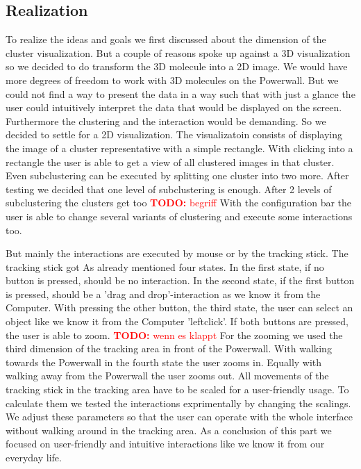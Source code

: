 \documentclass[journal]{vgtc}       %
\newcommand{\todo}[1]{\textcolor{red}{\textbf{TODO:} #1}}
\begin{document}
\subsection{Realization}

To realize the ideas and goals we first discussed about the dimension of the cluster visualization. But a couple of reasons spoke up against a 3D visualization so we decided to do transform the 3D molecule into a 2D image. We would have more degrees of freedom to work with 3D molecules on the Powerwall. But we could not find a way to present the data in a way such that with just a glance the user could intuitively interpret the data that would be displayed on the screen. Furthermore the clustering and the interaction would be demanding. So we decided to settle for a 2D visualization. 
The visualizatoin consists of displaying the image of a cluster representative with a simple rectangle. With clicking into a rectangle the user is able to get a view of all clustered images in that cluster. Even subclustering can be executed by splitting one cluster into two more. After testing we decided that one level of subclustering is enough. After 2 levels of subclustering the clusters get too  \todo{begriff}
With the configuration bar the user is able to change several variants of clustering and execute some interactions too. 

But mainly the interactions are executed by mouse or by the tracking stick. The tracking stick got As already mentioned four states. In the first state, if no button is pressed, should be no interaction. In the second state, if the first button is pressed, should be a 'drag and drop'-interaction as we know it from the Computer. With pressing the other button, the third state, the user can select an object like we know it from the Computer 'leftclick'. If both buttons are pressed, the user is able to zoom. \todo{wenn es klappt} For the zooming we used the third dimension of the tracking area in front of the Powerwall. With walking towards the Powerwall in the fourth state the user zooms in. Equally with walking away from the Powerwall the user zooms out. 
All movements of the tracking stick in the tracking area have to be scaled for a user-friendly usage. To calculate them we tested the interactions exprimentally by changing the scalings. We adjust these parameters so that the user can operate with the whole interface without walking around in the tracking area.
As a conclusion of this part we focused on user-friendly and intuitive interactions like we know it from our everyday life.
\end{document}
